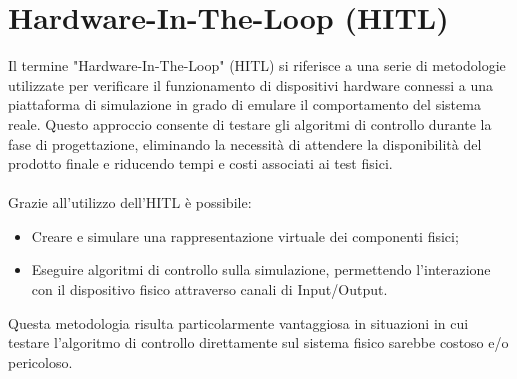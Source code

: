 \section{Hardware-In-The-Loop (HITL)}
Il termine "Hardware-In-The-Loop" (HITL) si riferisce a una serie di metodologie utilizzate per verificare il funzionamento di dispositivi hardware connessi a una piattaforma di simulazione in grado di emulare il comportamento del sistema reale. Questo approccio consente di testare gli algoritmi di controllo durante la fase di progettazione, eliminando la necessità di attendere la disponibilità del prodotto finale e riducendo tempi e costi associati ai test fisici.
\\~\\
Grazie all'utilizzo dell'HITL è possibile:
\begin{itemize}
    \item Creare e simulare una rappresentazione virtuale dei componenti fisici;
    \item Eseguire algoritmi di controllo sulla simulazione, permettendo l'interazione con il dispositivo fisico attraverso canali di Input/Output.
\end{itemize}
Questa metodologia risulta particolarmente vantaggiosa in situazioni in cui testare l'algoritmo di controllo direttamente sul sistema fisico sarebbe costoso e/o pericoloso. 
